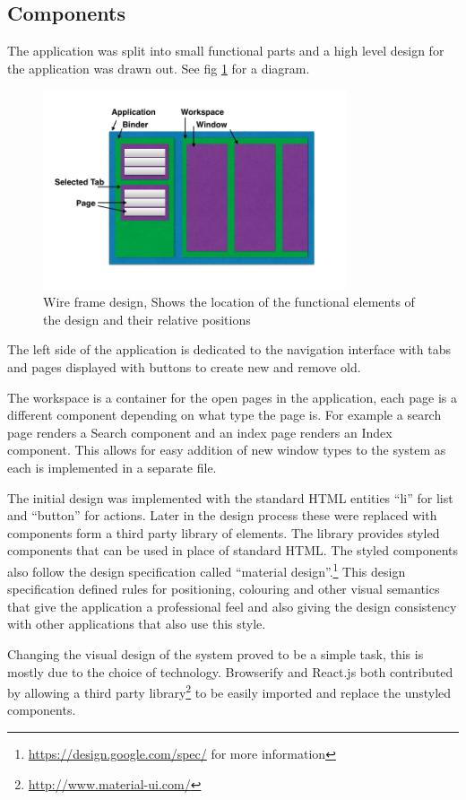 \subsection{Components}\label{components}

The application was split into small functional parts and a high level
design for the application was drawn out. See fig \ref{fig:wireframe} for a diagram.

\begin{figure}
  \includegraphics[width=0.8\textwidth]{Figures/WireframeDesign.png}
  \caption{Wire frame design, Shows the location of the functional elements of
  the design and their relative positions}
  \label{fig:wireframe}
\end{figure}


The left side of the application is dedicated to the navigation
interface with tabs and pages displayed with buttons to create new and
remove old.

The workspace is a container for the open pages in the application, each
page is a different component depending on what type the page is. For
example a search page renders a Search component and an index page
renders an Index component. This allows for easy addition of new window
types to the system as each is implemented in a separate file.

The initial design was implemented with the standard HTML entities ``li''
for list and ``button'' for actions. Later in the design process these
were replaced with components form a third party library of elements. The library
provides styled components that can be used in place of standard HTML. 
The styled components also follow the design specification called
``material design''.\footnote{\url{https://design.google.com/spec/} for more
information} This design specification defined rules for positioning, colouring
and other visual semantics that give the application a professional feel and 
also giving the design consistency with other applications that also use 
this style.

Changing the visual design of the system proved to be a simple task, this is
mostly due to the choice of technology. Browserify and React.js both contributed
by allowing a third party library\footnote{\url{http://www.material-ui.com/}} to 
be easily imported and replace the unstyled components.
